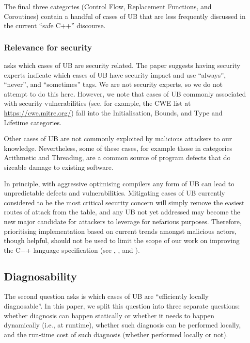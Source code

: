 The final three categories (Control Flow, Replacement Functions, and Coroutines) contain a handful of cases of UB that are less frequently discussed in the current ``safe C++'' discourse.

\subsubsection{Relevance for security}

\cite{P3656R1} asks which cases of UB are security related. The paper suggests having security experts indicate which cases of UB have security impact and use ``always'', ``never'', and ``sometimes'' tags. We are not security experts, so we do not attempt to do this here. However, we note that cases of UB commonly associated with security vulnerabilities (see, for example, the CWE list at \url{https://cwe.mitre.org/}) fall into the Initialisation, Bounds, and Type and Lifetime categories. 

Other cases of UB are not commonly exploited by malicious attackers to our knowledge. Nevertheless, some of these cases, for example those in categories Arithmetic and Threading, are a common source of program defects that do sizeable damage to existing software.

In principle, with aggressive optimising compilers any form of UB can lead to unpredictable defects and vulnerabilities. Mitigating cases of UB currently considered to be the most critical security concern will simply remove the easiest routes of attack from the table, and any UB not yet addressed may become the new major candidate for attackers to leverage for nefarious purposes.  Therefore, prioritising implementation based on current trends amongst malicious actors, though helpful, should not be used to limit the scope of our work on improving the C++ language specification (see \cite{Sutter2024}, \cite{P3500R1}, and \cite{P3578R0}).

\subsection{Diagnosability} 

The second question \cite{P3656R1} asks is which cases of UB are ``efficiently locally diagnosable''. In this paper, we split this question into three separate questions: whether diagnosis can happen statically or whether it needs to happen dynamically (i.e., at runtime), whether such diagnosis can be performed locally, and the run-time cost of such diagnosis (whether performed locally or not).

